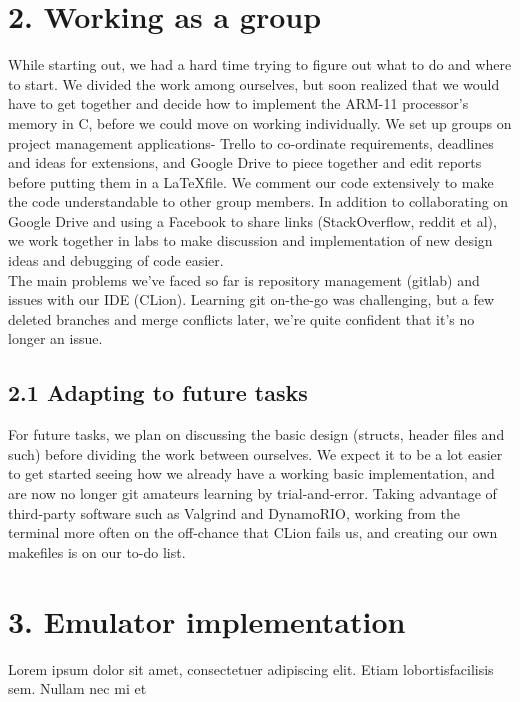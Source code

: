 \documentclass[a4paper, twoside]{report}
\begin{document}
\section*{2. Working as a group}
While starting out, we had a hard time trying to figure out what to do and where to start. We divided the work among ourselves, but soon realized that we would have to get together and decide how to implement the ARM-11 processor's memory in C, before we could move on working individually. 
We set up groups on project management applications- Trello to co-ordinate requirements, deadlines and ideas for extensions, and Google Drive to piece together and edit reports before putting them in a \LaTeX file. We comment our code extensively to make the code understandable to other group members. In addition to collaborating on Google Drive and using a Facebook to share links (StackOverflow, reddit et al), we work together in labs to make discussion and implementation of new design ideas and debugging of code easier. \\
The main problems we've faced so far is repository management (gitlab) and issues with our IDE (CLion). Learning git on-the-go was challenging, but a few deleted branches and merge conflicts later, we're quite confident that it's no longer an issue.

\subsection*{2.1 Adapting to future tasks}

For future tasks, we plan on discussing the basic design (structs, header files and such) before dividing the work between ourselves. We expect it to be a lot easier to get started seeing how we already have a working basic implementation, and are now no longer git amateurs learning by trial-and-error. Taking advantage of third-party software such as Valgrind and DynamoRIO, working from the terminal more often on the off-chance that CLion fails us, and creating our own makefiles is on our to-do list. 
\section*{}

\section*{3. Emulator implementation}
Lorem  ipsum  dolor  sit  amet,  consectetuer  adipiscing  
elit.   Etiam  lobortisfacilisis sem.  Nullam nec mi et 
\end{document}

